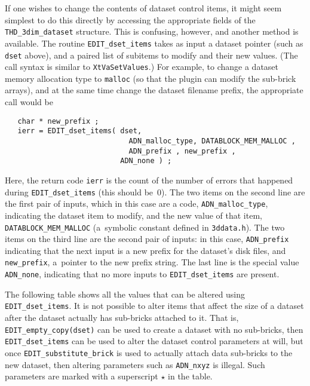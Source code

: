   If one wishes to change the contents of dataset control items,
  it might seem simplest to do this directly by accessing the
  appropriate fields of the {\tt THD\_3dim\_dataset} structure.
  This is confusing, however, and another method is available.
  The routine {\tt EDIT\_dset\_items} takes as input a dataset
  pointer (such as {\tt dset} above), and a paired list
  of subitems to modify and their new values.  (The call syntax
  is similar to {\tt XtVaSetValues}.)  For example, to
  change a dataset memory allocation type to {\tt malloc}
  (so that the plugin can modify the sub-brick arrays), and at the
  same time change the dataset filename prefix,
  the appropriate call would be
\begin{samepage}\begin{verbatim}
   char * new_prefix ;
   ierr = EDIT_dset_items( dset,
                             ADN_malloc_type, DATABLOCK_MEM_MALLOC ,
                             ADN_prefix , new_prefix ,
                           ADN_none ) ;
\end{verbatim}\end{samepage}
  Here, the return code {\tt ierr} is the count of the number of errors
  that happened during {\tt EDIT\_dset\_items} (this should be~0).
  The two items on the
  second line are the first pair of inputs, which in this
  case are a code, {\tt ADN\_malloc\_type}, indicating the dataset item
  to modify, and the new value of that item, {\tt DATABLOCK\_MEM\_MALLOC}
  (a~symbolic constant defined in {\tt 3ddata.h}).
  The two items on the third line are the second pair of
   inputs: in this case, {\tt ADN\_prefix} indicating
  that the next input is a new prefix for the dataset's disk files,
  and {\tt new\_prefix}, a~pointer to the new prefix string.
  The last line is the special value {\tt ADN\_none}, indicating that
  no more inputs to {\tt EDIT\_dset\_items} are present.

  The following table shows all the values that can be altered using
  {\tt EDIT\_dset\_items}.  It is not possible to alter items that
  affect the size of a dataset after the dataset actually has
  sub-bricks attached to it.  That is, {\tt EDIT\_empty\_copy(dset)}
  can be used to create a dataset with no sub-bricks, then {\tt EDIT\_dset\_items}
  can be used to alter the dataset control parameters at will, but
  once {\tt EDIT\_substitute\_brick} is used to actually attach 
  data sub-bricks to the new dataset, then altering parameters
  such as {\tt ADN\_nxyz} is illegal.  Such parameters are marked with a superscript $\star$ in
  the table.

